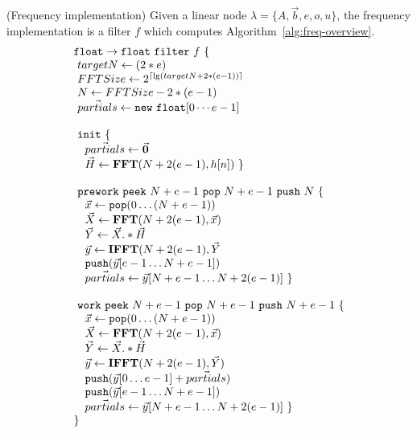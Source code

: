 \begin{transformation} (Frequency implementation)
Given a linear node $\lambda = \{A, {\vec b}, e, o, u\}$, 
the frequency implementation is a filter $f$ which
computes Algorithm~\ref{alg:freq-overview}. 
\\
\begin{equation} \nonumber
  \begin{array}{l}
    {\tt float \rightarrow float}~{\tt filter}~f~{\tt \{} \\
    ~targetN        \leftarrow (2*e) \\
    ~FFTSize        \leftarrow 2^{\lceil \lg(targetN + 2*(e-1)) \rceil} \\
    ~N              \leftarrow FFTSize - 2*(e-1) \\ 
    ~\vec{partials} \leftarrow {\tt new~float}[0\cdots e-1] \\
    \\
    ~{\tt init}~{\tt \{} \\
    ~~~\vec{partials} \leftarrow \vec{\mathbf{0}} \\
    ~~~\vec{H} \leftarrow \mathbf{FFT}(N+2(e-1),h[n])~{\tt \}} \\
    \\
    ~{\tt prework}~{\tt peek}~N+e-1~{\tt pop}~N+e-1~{\tt push}~N~{\tt \{}\\
    ~~~\vec{x} \leftarrow {\tt pop}(0 \dots (N+e-1)) \\
    ~~~\vec{X} \leftarrow \mathbf{FFT} (N+2(e-1), \vec{x}) \\
    ~~~\vec{Y} \leftarrow \vec{X} .* \vec{H} \\
    ~~~\vec{y} \leftarrow \mathbf{IFFT}(N+2(e-1), \vec{Y} \\
    ~~~{\tt push}(\vec{y}[e-1 \dots N+e-1]) \\
    ~~~\vec{partials} \leftarrow \vec{y}[N+e-1 \dots N+2(e-1)]~{\tt \}} \\
    \\
    ~{\tt work}~{\tt peek}~N+e-1~{\tt pop}~N+e-1~{\tt push}~N+e-1~{\tt \{} \\
    ~~~\vec{x} \leftarrow {\tt pop}(0 \dots (N+e-1)) \\
    ~~~\vec{X} \leftarrow \mathbf{FFT} (N+2(e-1), \vec{x}) \\
    ~~~\vec{Y} \leftarrow \vec{X} .* \vec{H} \\
    ~~~\vec{y} \leftarrow \mathbf{IFFT}(N+2(e-1), \vec{Y}) \\
    ~~~{\tt push}(\vec{y}[0 \dots e-1] + \vec{partials})\\
    ~~~{\tt push}(\vec{y}[e-1 \dots N+e-1]) \\
    ~~~\vec{partials} \leftarrow \vec{y}[N+e-1 \dots N+2(e-1)]~{\tt \}} \\
    {\tt \}}
  \end{array} \\
\end{equation}
\label{trans:freq}
\end{transformation}



